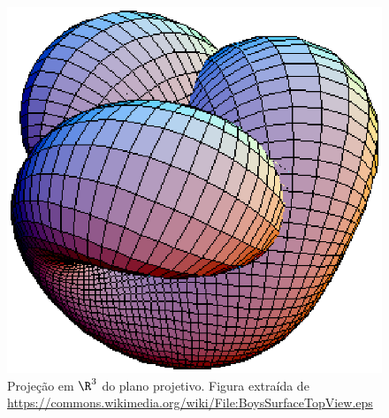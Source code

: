 \begin{figure}[h]
\begin{center} 
\includegraphics*[angle=0,scale=0.5]{imagens/cap2/BoysSurfaceTopView.eps} 
\caption{Proje\c{c}\~ao em $\R^3$ do plano projetivo. Figura extraída de \url{https://commons.wikimedia.org/wiki/File:BoysSurfaceTopView.eps} } 
\label{fig.BoySurface}
\end{center}
\end{figure}


